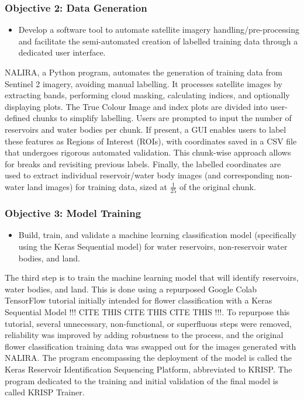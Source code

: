 \subsubsection{Objective 2: Data Generation}
\begin{itemize}
    \item Develop a software tool to automate satellite imagery handling/pre-processing and facilitate the semi-automated creation of labelled training data through a dedicated user interface. 
\end{itemize}
NALIRA, a Python program, automates the generation of training data from Sentinel 2 imagery, avoiding manual labelling. It processes satellite images by extracting bands, performing cloud masking, calculating indices, and optionally displaying plots. The True Colour Image and index plots are divided into user-defined chunks to simplify labelling. Users are prompted to input the number of reservoirs and water bodies per chunk. If present, a GUI enables users to label these features as Regions of Interest (ROIs), with coordinates saved in a CSV file that undergoes rigorous automated validation. This chunk-wise approach allows for breaks and revisiting previous labels. Finally, the labelled coordinates are used to extract individual reservoir/water body images (and corresponding non-water land images) for training data, sized at $\frac{1}{25}$ of the original chunk.

\subsubsection{Objective 3: Model Training}
\begin{itemize}
    \item Build, train, and validate a machine learning classification model (specifically using the Keras Sequential model) for water reservoirs, non-reservoir water bodies, and land.
\end{itemize}
The third step is to train the machine learning model that will identify reservoirs, water bodies, and land. This is done using a repurposed Google Colab TensorFlow tutorial initially intended for flower classification with a Keras Sequential Model !!! CITE THIS CITE THIS CITE THIS !!!. To repurpose this tutorial, several unnecessary, non-functional, or superfluous steps were removed, reliability was improved by adding robustness to the process, and the original flower classification training data was swapped out for the images generated with NALIRA. The program encompassing the deployment of the model is called the Keras Reservoir Identification Sequencing Platform, abbreviated to KRISP. The program dedicated to the training and initial validation of the final model is called KRISP Trainer. 

